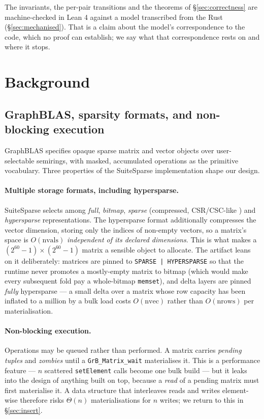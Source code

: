 \documentclass[11pt,a4paper]{article}
\theoremstyle{plain}
\theoremstyle{definition}
\theoremstyle{remark}
\begin{document}
The invariants, the per-pair transitions and the theorems of
\S\ref{sec:correctness} are machine-checked in Lean 4 against a model
transcribed from the Rust (\S\ref{sec:mechanised}). That is a claim about the
model's correspondence to the code, which no proof can establish; we say what
that correspondence rests on and where it stops.

\section{Background}
\label{sec:background}

\subsection{GraphBLAS, sparsity formats, and non-blocking execution}

GraphBLAS \cite{brock2021spec} specifies opaque sparse matrix and vector
objects over user-selectable semirings, with masked, accumulated operations
as the primitive vocabulary. Three properties of the SuiteSparse
implementation \cite{davis2019toms,davis2023toms} shape our design.

\paragraph{Multiple storage formats, including hypersparse.}
SuiteSparse selects among \emph{full}, \emph{bitmap}, \emph{sparse}
(compressed, CSR/CSC-like \cite{gustavson1978}) and \emph{hypersparse}
representations. The hypersparse format \cite{bulucgilbert2008} additionally
compresses the vector dimension, storing only the indices of non-empty
vectors, so a matrix's space is $O(\mathrm{nvals})$ \emph{independent of its
declared dimensions}. This is what makes a $(2^{60}-1) \times (2^{60}-1)$
matrix a sensible object to allocate. The artifact leans on it deliberately:
matrices are pinned to \texttt{SPARSE | HYPERSPARSE} so that the runtime never
promotes a mostly-empty matrix to bitmap (which would make every subsequent
fold pay a whole-bitmap \texttt{memset}), and delta layers are pinned
\emph{fully} hypersparse --- a small delta over a matrix whose row capacity
has been inflated to a million by a bulk load costs $O(\mathrm{nvec})$ rather
than $O(\mathrm{nrows})$ per materialisation.

\paragraph{Non-blocking execution.}
Operations may be queued rather than performed. A matrix carries
\emph{pending tuples} and \emph{zombies} until a \texttt{GrB\_Matrix\_wait}
materialises it. This is a performance feature --- $n$ scattered
\texttt{setElement} calls become one bulk build --- but it leaks into the
design of anything built on top, because a \emph{read} of a pending matrix
must first materialise it. A data structure that interleaves reads and writes
element-wise therefore risks $\Theta(n)$ materialisations for $n$ writes; we
return to this in \S\ref{sec:insert}.
\end{document}
